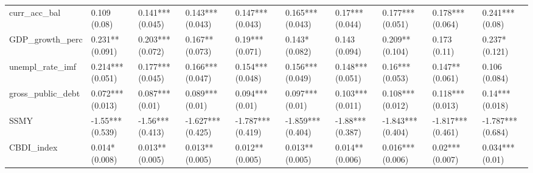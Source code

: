 \begin{table}[H]
\begin{subtable}[c]{\textwidth}
{\begin{tabular}{llllllllll}
  curr\_acc\_bal & 0.109 (0.08) & 0.141*** (0.045) & 0.143*** (0.043) & 0.147*** (0.043) & 0.165*** (0.043) & 0.17*** (0.044) & 0.177*** (0.051) & 0.178*** (0.064) & 0.241*** (0.08) \\ 
  GDP\_growth\_perc & 0.231** (0.091) & 0.203*** (0.072) & 0.167** (0.073) & 0.19*** (0.071) & 0.143* (0.082) & 0.143 (0.094) & 0.209** (0.104) & 0.173 (0.11) & 0.237* (0.121) \\ 
  unempl\_rate\_imf & 0.214*** (0.051) & 0.177*** (0.045) & 0.166*** (0.047) & 0.154*** (0.048) & 0.156*** (0.049) & 0.148*** (0.051) & 0.16*** (0.053) & 0.147** (0.061) & 0.106 (0.084) \\ 
  gross\_public\_debt & 0.072*** (0.013) & 0.087*** (0.01) & 0.089*** (0.01) & 0.094*** (0.01) & 0.097*** (0.01) & 0.103*** (0.011) & 0.108*** (0.012) & 0.118*** (0.013) & 0.14*** (0.018) \\ 
  SSMY & -1.55*** (0.539) & -1.56*** (0.413) & -1.627*** (0.425) & -1.787*** (0.419) & -1.859*** (0.404) & -1.88*** (0.387) & -1.843*** (0.404) & -1.817*** (0.461) & -1.787*** (0.684) \\ 
  CBDI\_index & 0.014* (0.008) & 0.013** (0.005) & 0.013** (0.005) & 0.012** (0.005) & 0.013** (0.005) & 0.014** (0.006) & 0.016*** (0.006) & 0.02*** (0.007) & 0.034*** (0.01) \\ 
   \bottomrule
\end{tabular}}



\end{subtable}
\end{table}

